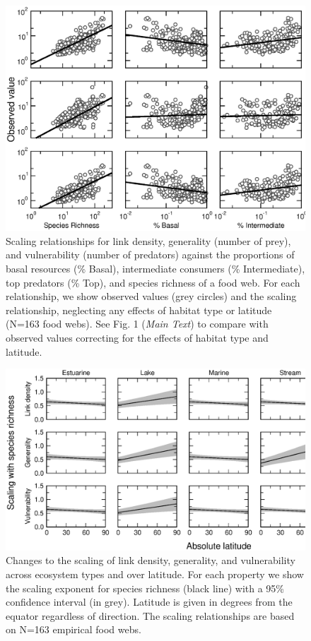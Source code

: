 \documentclass[12pt]{article}
\begin{document}
\begin{landscape}
\begin{figure}[H]
\includegraphics[width=.85\textwidth]{Figures/by_TL/scaling_with_S/proportions/fitlines_nonts_observed.eps}
\caption{Scaling relationships for link density, generality (number of prey), 
and vulnerability (number of predators) against the proportions of basal resources (\% Basal),
intermediate consumers (\% Intermediate), top predators (\% Top), and species richness of a food web. 
For each relationship, we show observed values (grey circles) and the scaling relationship, neglecting 
any effects of habitat type or latitude (N=163 food webs). See Fig. 1 (\emph{Main Text}) to compare with 
observed values correcting for the effects of habitat type and latitude. }
\label{props_v_lat_obs}
\end{figure}


\newpage

\begin{figure}[h]
\includegraphics[width=.85\textwidth]{Figures/by_TL/marginal/S_marginal_latitude_proportions.eps}
\caption{Changes to the scaling of link density, generality, and vulnerability across ecosystem
types and over latitude. For each property we show the scaling exponent for species richness (black
line) with a 95\% confidence interval (in grey). Latitude is given in degrees from the equator
regardless of direction. The scaling relationships are based on N=163 empirical food webs.}
\label{S}
\end{figure}



\end{landscape}
\end{document}
